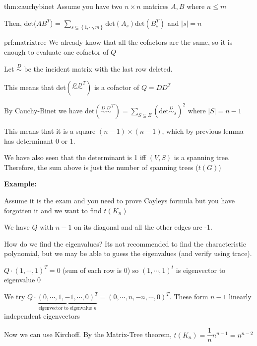 \par\bigskip
\begin{theo}{thm:cauchybinet}
  Assume you have two $n\times n$ matrices $A,B$ where $n\leq m$
  \par\bigskip
  \noindent Then, det($AB^T$) = $\sum_{s\subseteq\left\{1,\cdots,m\right\}}\text{det}(A_s)\text{det}(B^T_s)$ and $\left|s\right| = n$
\end{theo}
\newpage
\begin{prf}{prf:matrixtree}
  We already know that all the cofactors are the same, so it is enough to evaluate one cofactor of $Q$
  \par\bigskip
  \noindent Let $\stackrel{D}{\sim}$ be the incident matrix with the last row deleted.\par
  \noindent This means that det$(\stackrel{D}{\sim}\stackrel{D}{\sim}^T)$ is a cofactor of $Q = DD^T$
  \par\bigskip
  \noindent By Cauchy-Binet we have det$(\stackrel{D}{\sim}\stackrel{D}{\sim}^T) = \sum_{S\subseteq E}(\text{det}\stackrel{D}{\sim}_s)^2$ where $\left|S\right| = n-1$
  \par\bigskip
  \noindent This means that it is a square $(n-1)\times(n-1)$, which by previous lemma has determinant 0 or 1.\par
  \noindent We have also seen that the determinant is 1 iff $(V,S)$ is a spanning tree. Therefore, the sum above is just the number of spanning trees ($t(G)$) 
\end{prf}
\par\bigskip
\noindent\textbf{Example:}\par
\noindent Assume it is the exam and you need to prove Cayleys formula but you have forgotten it and we want to find $t(K_n)$ 
\par\bigskip
\noindent We have $Q$ with $n-1$ on its diagonal and all the other edges are -1.
\par\bigskip
\noindent How do we find the eigenvalues? Its not recommended to find the characteristic polynomial, but we may be able to guess the eigenvalues (and verify using trace).
\par\bigskip
\noindent $Q\cdot(1,\cdots,1)^T = 0$ (sum of each row is 0) so $(1,\cdots,1)^t$ is eigenvector to eigenvalue 0\par
\noindent We try $Q\cdot\underbrace{(0,\cdots,1,-1,\cdots,0)^T}_{\text{eigenvector to eigenvalue $n$}} = (0,\cdots,n,-n,\cdots,0)^T$. These form $n-1$ linearly independent eigenvectors
\par\bigskip
\noindent Now we can use Kirchoff. By the Matrix-Tree theorem, $t(K_n) = \dfrac{1}{n}n^{n-1} = n^{n-2}$
